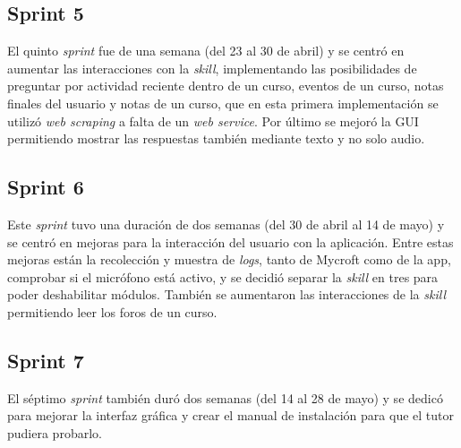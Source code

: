 

\subsection{Sprint 5}

El quinto \textit{sprint} fue de una semana (del 23 al 30 de abril) y se centró en aumentar las interacciones con la \textit{skill}, implementando las posibilidades de preguntar por actividad reciente dentro de un curso, eventos de un curso, notas finales del usuario y notas de un curso, que en esta primera implementación se utilizó \textit{web scraping} a falta de un \textit{web service}. Por último se mejoró la GUI permitiendo mostrar las respuestas también mediante texto y no solo audio.

 

\subsection{Sprint 6}

Este \textit{sprint} tuvo una duración de dos semanas (del 30 de abril al 14 de mayo) y se centró en mejoras para la interacción del usuario con la aplicación. Entre estas mejoras están la recolección y muestra de \textit{logs}, tanto de Mycroft como de la app, comprobar si el micrófono está activo, y se decidió separar la \textit{skill} en tres para poder deshabilitar módulos. También se aumentaron las interacciones de la \textit{skill} permitiendo leer los foros de un curso.

 

\subsection{Sprint 7}

El séptimo \textit{sprint} también duró dos semanas (del 14 al 28 de mayo) y se dedicó para mejorar la interfaz gráfica y crear el manual de instalación para que el tutor pudiera probarlo.

 

